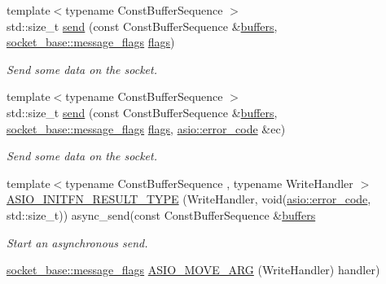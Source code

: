 \begin{DoxyCompactItemize}
{\footnotesize template$<$typename Const\+Buffer\+Sequence $>$ }\\std\+::size\+\_\+t \hyperlink{classasio_1_1basic__seq__packet__socket_acc510a32cc0f3a980f88cd92ba6ee0a6}{send} (const Const\+Buffer\+Sequence \&\hyperlink{group__async__read_ga54dede45c3175148a77fe6635222c47d}{buffers}, \hyperlink{classasio_1_1socket__base_ac3cf77465dfedfe1979b5415cf32cc94}{socket\+\_\+base\+::message\+\_\+flags} \hyperlink{classasio_1_1basic__seq__packet__socket_a075eb37b80c5f14590a257b5202e626f}{flags})
\begin{DoxyCompactList}\small\item\em Send some data on the socket. \end{DoxyCompactList}\item 
{\footnotesize template$<$typename Const\+Buffer\+Sequence $>$ }\\std\+::size\+\_\+t \hyperlink{classasio_1_1basic__seq__packet__socket_afd42797ef204c3a13715b8d4c34d88ed}{send} (const Const\+Buffer\+Sequence \&\hyperlink{group__async__read_ga54dede45c3175148a77fe6635222c47d}{buffers}, \hyperlink{classasio_1_1socket__base_ac3cf77465dfedfe1979b5415cf32cc94}{socket\+\_\+base\+::message\+\_\+flags} \hyperlink{classasio_1_1basic__seq__packet__socket_a075eb37b80c5f14590a257b5202e626f}{flags}, \hyperlink{classasio_1_1error__code}{asio\+::error\+\_\+code} \&ec)
\begin{DoxyCompactList}\small\item\em Send some data on the socket. \end{DoxyCompactList}\item 
{\footnotesize template$<$typename Const\+Buffer\+Sequence , typename Write\+Handler $>$ }\\\hyperlink{classasio_1_1basic__seq__packet__socket_a53b772a218d102301b4867646bfd3272}{A\+S\+I\+O\+\_\+\+I\+N\+I\+T\+F\+N\+\_\+\+R\+E\+S\+U\+L\+T\+\_\+\+T\+Y\+P\+E} (Write\+Handler, void(\hyperlink{classasio_1_1error__code}{asio\+::error\+\_\+code}, std\+::size\+\_\+t)) async\+\_\+send(const Const\+Buffer\+Sequence \&\hyperlink{group__async__read_ga54dede45c3175148a77fe6635222c47d}{buffers}
\begin{DoxyCompactList}\small\item\em Start an asynchronous send. \end{DoxyCompactList}\item 
\hyperlink{classasio_1_1socket__base_ac3cf77465dfedfe1979b5415cf32cc94}{socket\+\_\+base\+::message\+\_\+flags} \hyperlink{classasio_1_1basic__seq__packet__socket_a0ed9e982454a47512868d66ff7edcf26}{A\+S\+I\+O\+\_\+\+M\+O\+V\+E\+\_\+\+A\+R\+G} (Write\+Handler) handler)

\end{DoxyCompactItemize}
